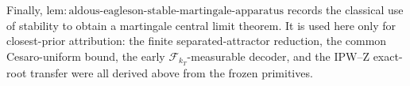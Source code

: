Finally, \(\mathrm{lem:aldous\text{-}eagleson\text{-}stable\text{-}martingale\text{-}apparatus}\) records the classical use of stability to obtain a martingale central limit theorem. It is used here only for closest-prior attribution: the finite separated-attractor reduction, the common Cesaro-uniform bound, the early \(\mathcal F_{k_T}\)-measurable decoder, and the IPW--Z exact-root transfer were all derived above from the frozen primitives.